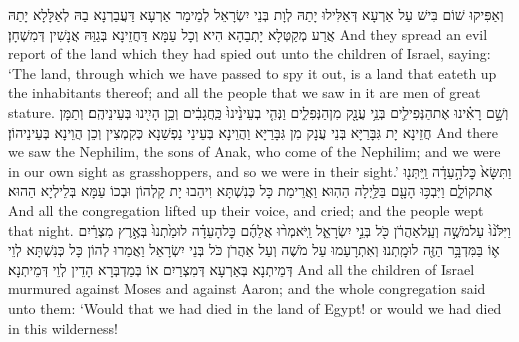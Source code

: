 {וְאַפִּיקוּ שׁוֹם בִּישׁ עַל אַרְעָא דְּאַלִּילוּ יָתַהּ לְוָת בְּנֵי יִשְׂרָאֵל לְמֵימַר אַרְעָא דַּעֲבַרְנָא בַהּ לְאַלָּלָא יָתַהּ אֲרַע מְקַטְּלָא יָתְבַהָא הִיא וְכָל עַמָּא דַּחֲזֵינָא בְּגַוַּהּ אֲנָשִׁין דְּמִשְׁחָן׃}
{And they spread an evil report of the land which they had spied out unto the children of Israel, saying: ‘The land, through which we have passed to spy it out, is a land that eateth up the inhabitants thereof; and all the people that we saw in it are men of great stature.}{}
{וְשָׁ֣ם רָאִ֗ינוּ אֶת\maqqaf הַנְּפִילִ֛ים בְּנֵ֥י עֲנָ֖ק מִן\maqqaf הַנְּפִלִ֑ים וַנְּהִ֤י בְעֵינֵ֙ינוּ֙ כַּֽחֲגָבִ֔ים וְכֵ֥ן הָיִ֖ינוּ בְּעֵינֵיהֶֽם׃}
{וְתַמָּן חֲזֵינָא יָת גִּבָּרַיָּא בְּנֵי עֲנָק מִן גִּבָּרַיָּא וַהֲוֵינָא בְּעֵינֵי נַפְשַׁנָא כְּקִמְצִין וְכֵן הֲוֵינָא בְּעֵינֵיהוֹן׃}
{And there we saw the Nephilim, the sons of Anak, who come of the Nephilim; and we were in our own sight as grasshoppers, and so we were in their sight.’}{}
\newperek
{}%
{וַתִּשָּׂא֙ כׇּל\maqqaf הָ֣עֵדָ֔ה וַֽיִּתְּנ֖וּ אֶת\maqqaf קוֹלָ֑ם וַיִּבְכּ֥וּ הָעָ֖ם בַּלַּ֥יְלָה הַהֽוּא׃}
{וַאֲרֵימַת כָּל כְּנִשְׁתָּא וִיהַבוּ יָת קָלְהוֹן וּבְכוֹ עַמָּא בְּלֵילְיָא הַהוּא׃}
{And all the congregation lifted up their voice, and cried; and the people wept that night.}{}
{וַיִּלֹּ֙נוּ֙ עַל\maqqaf מֹשֶׁ֣ה וְעַֽל\maqqaf אַהֲרֹ֔ן כֹּ֖ל בְּנֵ֣י יִשְׂרָאֵ֑ל וַֽיֹּאמְר֨וּ אֲלֵהֶ֜ם כׇּל\maqqaf הָעֵדָ֗ה לוּ\maqqaf מַ֙תְנוּ֙ בְּאֶ֣רֶץ מִצְרַ֔יִם א֛וֹ בַּמִּדְבָּ֥ר הַזֶּ֖ה לוּ\maqqaf מָֽתְנוּ׃}
{וְאִתְרָעַמוּ עַל מֹשֶׁה וְעַל אַהֲרֹן כֹּל בְּנֵי יִשְׂרָאֵל וַאֲמַרוּ לְהוֹן כָּל כְּנִשְׁתָּא לְוֵי דְּמֵיתְנָא בְּאַרְעָא דְּמִצְרַיִם אוֹ בְּמַדְבְּרָא הָדֵין לְוֵי דְּמֵיתְנָא׃}
{And all the children of Israel murmured against Moses and against Aaron; and the whole congregation said unto them: ‘Would that we had died in the land of Egypt! or would we had died in this wilderness!}{}
